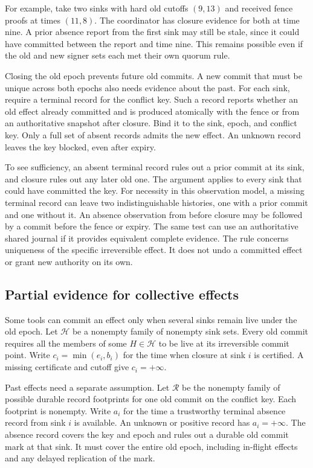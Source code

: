 \documentclass[11pt]{article}
\begin{document}
For example, take two sinks with hard old cutoffs $(9,13)$
and received fence proofs at times $(11,8)$. The coordinator
has closure evidence for both at time nine. A prior absence
report from the first sink may still be stale, since it could
have committed between the report and time nine. This remains
possible even if the old and new signer sets each met their
own quorum rule.

Closing the old epoch prevents future old commits. A new
commit that must be unique across both epochs also needs
evidence about the past. For each sink, require a terminal
record for the conflict key. Such a record reports whether
an old effect already committed and is produced atomically
with the fence or from an authoritative snapshot after
closure. Bind it to the sink, epoch, and conflict key.
Only a full set of absent records admits the new effect.
An unknown record leaves the key blocked, even after expiry.

To see sufficiency, an absent terminal record rules out a
prior commit at its sink, and closure rules out any later old
one. The argument applies to every sink that could have
committed the key. For necessity in this observation model,
a missing terminal record can leave two indistinguishable
histories, one with a prior commit and one without it. An
absence observation from before closure may be followed by a
commit before the fence or expiry. The same test can use an
authoritative shared journal if it provides equivalent
complete evidence. The rule concerns uniqueness of the
specific irreversible effect. It does not undo a committed
effect or grant new authority on its own.

\subsection{Partial evidence for collective effects}
Some tools can commit an effect only when several sinks remain
live under the old epoch. Let $\mathcal H$ be a nonempty family
of nonempty sink sets. Every old commit requires all the members
of some $H\in\mathcal H$ to be live at its irreversible commit
point. Write $c_i=\min(e_i,b_i)$ for the time when closure at sink
$i$ is certified. A missing certificate and cutoff give $c_i=+\infty$.

Past effects need a separate assumption. Let $\mathcal R$ be the
nonempty family of possible durable record footprints for one old
commit on the conflict key. Each footprint is nonempty. Write $a_i$
for the time a trustworthy terminal absence record from sink $i$
is available. An unknown or positive record has $a_i=+\infty$.
The absence record covers the key and epoch and rules out a durable
old commit mark at that sink. It must cover the entire old epoch,
including in-flight effects and any delayed replication of the mark.
\end{document}
